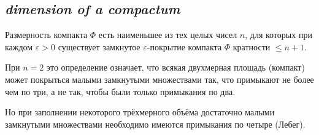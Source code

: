 \subsection*{ \textit{dimension of a compactum}}
\begin{rusblock}
Размерность компакта $\Phi$ есть наименьшее из тех целых чисел $n$, для которых при каждом $\varepsilon>0$ существует замкнутое $\varepsilon$-покрытие компакта $\Phi$ кратности $\le n+1$.

При $n=2$ это определение означает, что всякая двухмерная площадь (компакт) может покрыться малыми замкнутыми множествами так, что примыкают не более чем по три, а не так, чтобы были только примыкания по два.

Но при заполнении некоторого трёхмерного объёма достаточно малыми замкнутыми множествами необходимо имеются примыкания по четыре (Лебег).
\end{rusblock}

\endgroup
